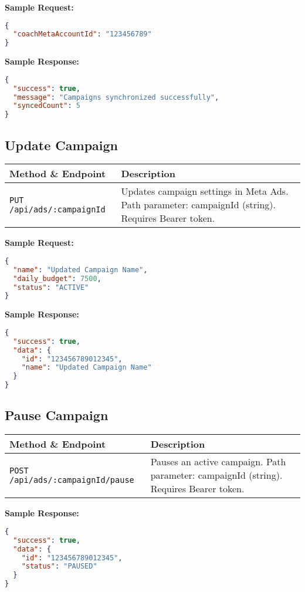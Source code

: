 \documentclass[11pt,a4paper]{article}
\begin{document}
\textbf{Sample Request:}
\begin{lstlisting}[language=json]
{
  "coachMetaAccountId": "123456789"
}
\end{lstlisting}

\textbf{Sample Response:}
\begin{lstlisting}[language=json]
{
  "success": true,
  "message": "Campaigns synchronized successfully",
  "syncedCount": 5
}
\end{lstlisting}

\subsection{Update Campaign}
\begin{longtable}{L{3cm}Y}
\toprule
\textbf{Method \& Endpoint} & \textbf{Description} \\
\midrule
\texttt{PUT /api/ads/:campaignId} & Updates campaign settings in Meta Ads. Path parameter: campaignId (string). Requires Bearer token. \\
\bottomrule
\end{longtable}

\textbf{Sample Request:}
\begin{lstlisting}[language=json]
{
  "name": "Updated Campaign Name",
  "daily_budget": 7500,
  "status": "ACTIVE"
}
\end{lstlisting}

\textbf{Sample Response:}
\begin{lstlisting}[language=json]
{
  "success": true,
  "data": {
    "id": "123456789012345",
    "name": "Updated Campaign Name"
  }
}
\end{lstlisting}

\subsection{Pause Campaign}
\begin{longtable}{L{3cm}Y}
\toprule
\textbf{Method \& Endpoint} & \textbf{Description} \\
\midrule
\texttt{POST /api/ads/:campaignId/pause} & Pauses an active campaign. Path parameter: campaignId (string). Requires Bearer token. \\
\bottomrule
\end{longtable}

\textbf{Sample Response:}
\begin{lstlisting}[language=json]
{
  "success": true,
  "data": {
    "id": "123456789012345",
    "status": "PAUSED"
  }
}
\end{lstlisting}
\end{document}
